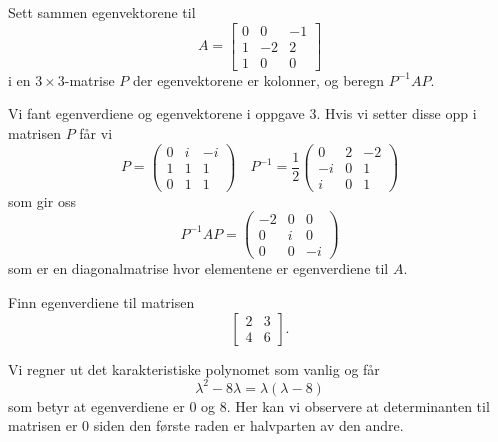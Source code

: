 \begin{oppgave}
Sett sammen egenvektorene til 
\[
A=
\begin{bmatrix}
0 & 0 & -1 \\ 1 & -2 & 2 \\ 1 & 0 & 0 
\end{bmatrix}
\]
i en $3 \times 3$-matrise $P$ der egenvektorene er kolonner, og beregn $P^{-1} A P$.
\end{oppgave}

\begin{losning}
	Vi fant egenverdiene og egenvektorene i oppgave 3. Hvis vi setter disse opp i matrisen $P$ får vi
	\begin{equation*}
		P = \begin{pmatrix}
				0 & i & -i \\
				1 & 1 & 1 \\
				0 & 1 & 1 
			\end{pmatrix}
			\quad P^{-1} = \frac{1}{2}
			\begin{pmatrix}
				0 & 2 & -2 \\
				 -i & 0 & 1 \\
				 i & 0 & 1
			\end{pmatrix}
	\end{equation*}
	som gir oss
	\begin{equation*}
		P^{-1}AP = \begin{pmatrix}
			-2 & 0 & 0 \\
			0 & i & 0 \\
			0 & 0 & -i 
		\end{pmatrix}
	\end{equation*}
	som er en diagonalmatrise hvor elementene er egenverdiene til $A$.
\end{losning}

\begin{oppgave}
Finn egenverdiene til matrisen 
\[
\begin{bmatrix}
2 & 3  \\ 4 & 6 
\end{bmatrix}.
\]
\end{oppgave}

\begin{losning}
	Vi regner ut det karakteristiske polynomet som vanlig og får 
	\begin{equation*}
		\lambda^2 - 8\lambda = \lambda(\lambda - 8)
	\end{equation*}
	som betyr at egenverdiene er $0$ og $8$. Her kan vi observere at determinanten til matrisen er $0$ siden den første raden er halvparten av den andre.
\end{losning}

